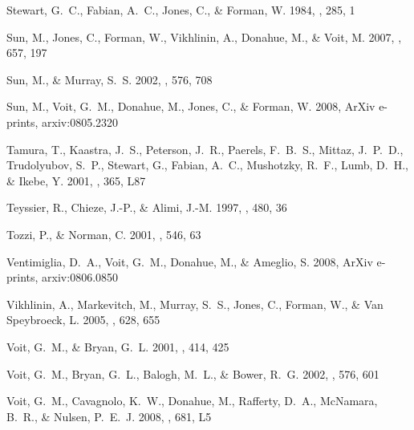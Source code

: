 \documentclass[12pt,preprint]{aastex}
\begin{document}
\begin{thebibliography}{137}
{Stewart}, G.~C., {Fabian}, A.~C., {Jones}, C., \& {Forman}, W. 1984, \apj,
  285, 1

{Sun}, M., {Jones}, C., {Forman}, W., {Vikhlinin}, A., {Donahue}, M., \&
  {Voit}, M. 2007, \apj, 657, 197

{Sun}, M., \& {Murray}, S.~S. 2002, \apj, 576, 708

{Sun}, M., {Voit}, G.~M., {Donahue}, M., {Jones}, C., \& {Forman}, W. 2008,
  ArXiv e-prints, arxiv:0805.2320

{Tamura}, T., {Kaastra}, J.~S., {Peterson}, J.~R., {Paerels}, F.~B.~S.,
  {Mittaz}, J.~P.~D., {Trudolyubov}, S.~P., {Stewart}, G., {Fabian}, A.~C.,
  {Mushotzky}, R.~F., {Lumb}, D.~H., \& {Ikebe}, Y. 2001, \aap, 365, L87

{Teyssier}, R., {Chieze}, J.-P., \& {Alimi}, J.-M. 1997, \apj, 480, 36

{Tozzi}, P., \& {Norman}, C. 2001, \apj, 546, 63

{Ventimiglia}, D.~A., {Voit}, G.~M., {Donahue}, M., \& {Ameglio}, S. 2008,
  ArXiv e-prints, arxiv:0806.0850

{Vikhlinin}, A., {Markevitch}, M., {Murray}, S.~S., {Jones}, C., {Forman}, W.,
  \& {Van Speybroeck}, L. 2005, \apj, 628, 655

{Voit}, G.~M., \& {Bryan}, G.~L. 2001, \nat, 414, 425

{Voit}, G.~M., {Bryan}, G.~L., {Balogh}, M.~L., \& {Bower}, R.~G. 2002, \apj,
  576, 601

{Voit}, G.~M., {Cavagnolo}, K.~W., {Donahue}, M., {Rafferty}, D.~A.,
  {McNamara}, B.~R., \& {Nulsen}, P.~E.~J. 2008, \apjl, 681, L5


\end{thebibliography}
\end{document}
